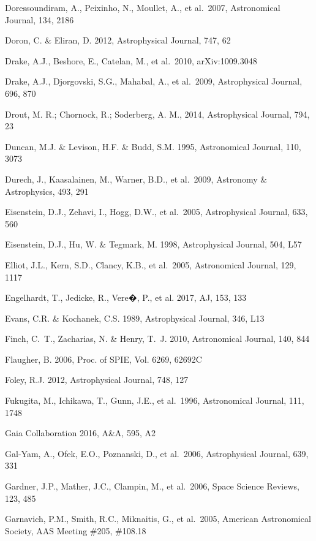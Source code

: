 \documentclass{emulateapj}
\begin{document}
\begin{thebibliography}{}
\bibitem[()]{} Doressoundiram, A., Peixinho, N., Moullet, A., et al.~2007, Astronomical Journal, 134, 2186

\bibitem[()]{} Doron, C. \& Eliran, D. 2012, Astrophysical Journal, 747, 62

\bibitem[()]{} Drake, A.J., Beshore, E., Catelan, M., et al.~2010, arXiv:1009.3048

\bibitem[()]{} Drake, A.J., Djorgovski, S.G., Mahabal, A., et al.~2009, Astrophysical Journal, 696, 870


\bibitem[()]{} Drout, M. R.; Chornock, R.; Soderberg, A. M., 2014, Astrophysical Journal,  794, 23

\bibitem[()]{} Duncan, M.J. \& Levison, H.F. \& Budd, S.M. 1995, Astronomical Journal, 110, 3073

\bibitem[()]{} Durech, J., Kaasalainen, M., Warner, B.D., et al.~2009, Astronomy \& Astrophysics, 493, 291

\bibitem[()]{} Eisenstein, D.J., Zehavi, I., Hogg, D.W., et al.~2005, Astrophysical Journal, 633, 560

\bibitem[()]{} Eisenstein, D.J., Hu, W. \& Tegmark, M. 1998, Astrophysical Journal, 504, L57

\bibitem[()]{} Elliot, J.L., Kern, S.D., Clancy, K.B., et al.~2005,  Astronomical Journal, 129, 1117

\bibitem[()]{} Engelhardt, T., Jedicke, R., Vere�, P., et al. 2017, AJ, 153, 133

\bibitem[()]{} Evans, C.R. \& Kochanek, C.S. 1989, Astrophysical Journal, 346, L13

\bibitem[()]{} Finch, C.~T., Zacharias, N. \& Henry, T.~J. 2010, Astronomical Journal, 140, 844

\bibitem[()]{} Flaugher, B. 2006, Proc. of SPIE, Vol. 6269, 62692C

\bibitem[()]{} Foley, R.J. 2012, Astrophysical Journal, 748, 127

\bibitem[()]{} Fukugita, M., Ichikawa, T., Gunn, J.E., et al.~1996, Astronomical Journal, 111, 1748

 Gaia Collaboration 2016, A\&A, 595, A2

\bibitem[()]{} Gal-Yam, A., Ofek, E.O., Poznanski, D., et al.~2006, Astrophysical Journal, 639, 331

\bibitem[()]{} Gardner, J.P., Mather, J.C., Clampin, M., et al.~2006, Space Science Reviews, 123, 485

\bibitem[()]{} Garnavich, P.M., Smith, R.C., Miknaitis, G., et al.~2005,
             American Astronomical Society, AAS Meeting \#205, \#108.18


\end{thebibliography}
\end{document}
